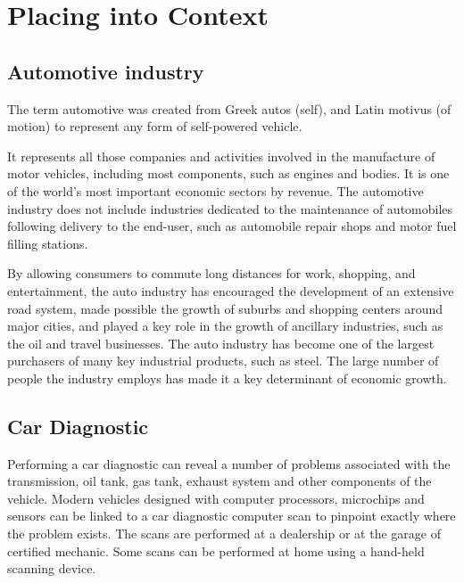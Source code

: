 
\chapter{Placing into Context} %

\label{Chapter3} %



\section{Automotive industry}

The term automotive was created from Greek autos (self), and Latin motivus (of motion) to represent any form of self-powered vehicle.

It represents all those companies and activities involved in the manufacture of motor vehicles, including most components, such as engines and bodies. It is one of the world's most important economic sectors by revenue. The automotive industry does not include industries dedicated to the maintenance of automobiles following delivery to the end-user, such as automobile repair shops and motor fuel filling stations.

By allowing consumers to commute long distances for work, shopping, and entertainment, the auto industry has encouraged the development of an extensive road system, made possible the growth of suburbs and shopping centers around major cities, and played a key role in the growth of ancillary industries, such as the oil and travel businesses. The auto industry has become one of the largest purchasers of many key industrial products, such as steel. The large number of people the industry employs has made it a key determinant of economic growth.

\section{Car Diagnostic}
Performing a car diagnostic can reveal a number of problems associated with the transmission, oil tank, gas tank, exhaust system and other components of the vehicle. Modern vehicles designed with computer processors, microchips and sensors can be linked to a car diagnostic computer scan to pinpoint exactly where the problem exists. The scans are performed at a dealership or at the garage of certified mechanic. Some scans can be performed at home using a hand-held scanning device.


